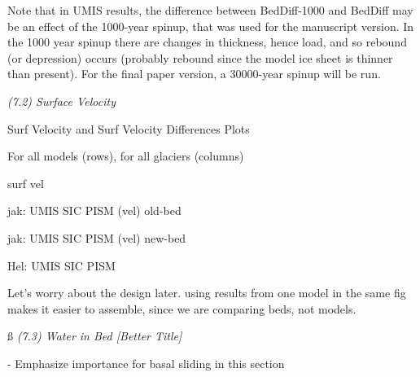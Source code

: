 \documentclass[11pt]{article}
\begin{document}
 
 
 
 Note that in UMIS results, the difference between BedDiff-1000 and BedDiff  may be an effect of the 1000-year spinup, that was used for the manuscript version. In the 1000 year spinup there are changes in thickness, hence load, and so rebound (or depression) occurs (probably rebound since the model ice sheet is thinner than present). For the final paper version, a 30000-year spinup will be run.
 
 
 {\it (7.2) Surface Velocity}
 
 
 Surf Velocity and Surf Velocity Differences Plots
 
 For all models (rows), for all glaciers (columns)
 
 surf vel
 
jak: UMIS SIC PISM  (vel) old-bed

jak: UMIS SIC PISM  (vel) new-bed
 
 Hel: UMIS SIC PISM 
 
 
 Let's worry about the design later. using results from one model in the same fig makes it easier to assemble,
 since we are comparing beds, not models.
 
 \ss
 {\it (7.3) Water in Bed [Better Title]}
 
 
 
 - Emphasize importance for basal sliding in this section
% 
% 
% 
%
 
\end{document}
